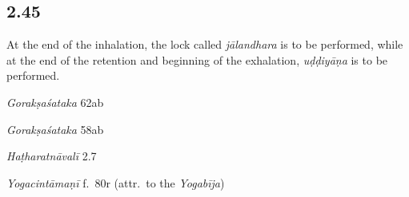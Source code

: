 \begin{ekdosis}


\subsection*{2.45}
\begin{translation}[hp02_045]
At the end of the inhalation, the lock called \emph{jālandhara} is to be performed, while at the end of the retention and beginning of the exhalation, \emph{uḍḍiyāṇa} is to be performed.
\end{translation}

\begin{sources}[hp02_045]
\emph{Gorakṣaśataka} 62ab

\begin{versinnote}
\end{versinnote}
\emph{Gorakṣaśataka} 58ab

\begin{versinnote}
\end{versinnote}
\end{sources}

\begin{testimonia}[hp02_045]
\emph{Haṭharatnāvalī} 2.7

\begin{versinnote}
\end{versinnote} 

\emph{Yogacintāmaṇī} f.~80r (attr.~to the \emph{Yogabīja})

\begin{versinnote}
\end{versinnote}


\end{testimonia}
\end{ekdosis}
